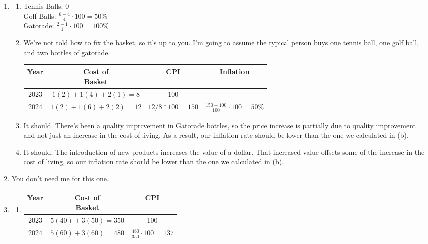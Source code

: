 \documentclass{article}
\begin{document}
\begin{enumerate}
\item
	
	\begin{enumerate}
		
	\item Tennis Balls: 0 \\
		Golf Balls: $\frac{6 - 4}{4} \cdot 100 = 50\%$ \\
		Gatorade: $\frac{2 - 1}{1} \cdot 100 = 100\%$
		
	\item We're not told how to fix the basket, so it's up to you. I'm going to assume the typical person buys one tennis ball, one golf ball, and two bottles of gatorade.
		
		\begin{tabular}{| c | c | c | c |}
		\hline
		Year & \makecell{Cost of\\Basket} & CPI & Inflation \\
		\hline
		2023 & $1(2) + 1(4) + 2(1) = 8$ & 100 & -- \\
		\hline
		2024 & $1(2) + 1(6) + 2(2) = 12$ & $12 / 8 * 100 = 150$ & $\frac{150 - 100}{100} \cdot 100 = 50\%$ \\
		\hline
		\end{tabular}
			
	\item It should. There's been a quality improvement in Gatorade bottles, so the price increase is partially due to quality improvement and not just an increase in the cost of living. As a result, our inflation rate should be lower than the one we calculated in (b).
		
	\item It should. The introduction of new products increases the value of a dollar. That increased value offsets some of the increase in the cost of living, so our inflation rate should be lower than the one we calculated in (b).
		
	\end{enumerate}
		
\item You don't need me for this one.
	
\item 

	\begin{enumerate}
	
	\item \phantom{x}
		
		\begin{center}
		\begin{tabular}{| c | c | c |}
		\hline
		Year & \makecell{Cost of\\Basket} & CPI \\
		\hline
		2023 & $5(40) + 3(50) = 350$ & 100\\
		\hline
		2024 & $5(60) + 3(60) = 480$ & $\frac{480}{350} \cdot 100 = 137$ \\
		\hline
		\end{tabular}
		\end{center}
		

\end{enumerate}
\end{enumerate}
\end{document}
